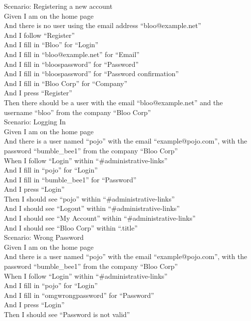 \documentclass[12pt]{article}
\begin{document}
Scenario: Registering a new account \\
Given I am on the home page \\
And there is no user using the email address ``bloo@example.net'' \\
And I follow ``Register'' \\
And I fill in ``Bloo'' for ``Login'' \\
And I fill in ``bloo@example.net'' for ``Email'' \\
And I fill in ``bloospassword'' for ``Password'' \\
And I fill in ``bloospassword'' for ``Password confirmation'' \\
And I fill in ``Bloo Corp'' for ``Company'' \\
And I press ``Register'' \\
Then there should be a user with the email ``bloo@example.net'' and the username ``bloo'' from the company ``Bloo Corp'' \\

Scenario: Logging In \\
Given I am on the home page \\
And there is a user named ``pojo'' with the email ``example@pojo.com'', with the password ``bumble\_bee1'' from the company ``Bloo Corp'' \\
When I follow ``Login'' within ``\#administrative-links'' \\
And I fill in ``pojo'' for ``Login'' \\
And I fill in ``bumble\_bee1'' for ``Password'' \\
And I press ``Login'' \\
Then I should see ``pojo'' within ``\#administrative-links'' \\
And I should see ``Logout'' within ``\#administrative-links'' \\
And I should see ``My Account'' within ``\#administrative-links'' \\
And I should see ``Bloo Corp'' within ``.title'' \\

Scenario: Wrong Password \\
  Given I am on the home page \\
  And there is a user named ``pojo'' with the email ``example@pojo.com'', with the password ``bumble\_bee1'' from the company ``Bloo Corp'' \\
  When I follow ``Login'' within ``\#administrative-links'' \\
  And I fill in ``pojo'' for ``Login'' \\
  And I fill in ``omgwrongpassword'' for ``Password'' \\
  And I press ``Login'' \\
  Then I should see ``Password is not valid'' \\
\end{document}

